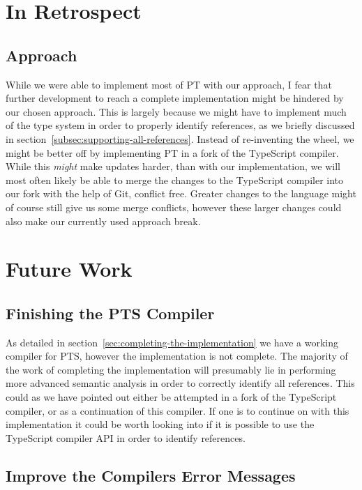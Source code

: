\section{In Retrospect}\label{sec:in-retrospect}

\subsection{Approach}\label{subsec:result-approach}

While we were able to implement most of PT with our approach, I fear that further development to reach a complete implementation might be hindered by our chosen approach.
This is largely because we might have to implement much of the type system in order to properly identify references, as we briefly discussed in section~\vref{subsec:supporting-all-references}.
Instead of re-inventing the wheel, we might be better off by implementing PT in a fork of the TypeScript compiler.
While this \textit{might} make updates harder, than with our implementation, we will most often likely be able to merge the changes to the TypeScript compiler into our fork with the help of Git, conflict free.
Greater changes to the language might of course still give us some merge conflicts, however these larger changes could also make our currently used approach break.

\section{Future Work}\label{sec:future-work}

\subsection{Finishing the PTS Compiler}\label{subsec:finishing-the-pts-compiler}

As detailed in section~\vref{sec:completing-the-implementation} we have a working compiler for PTS, however the implementation is not complete.
The majority of the work of completing the implementation will presumably lie in performing more advanced semantic analysis in order to correctly identify all references.
This could as we have pointed out either be attempted in a fork of the TypeScript compiler, or as a continuation of this compiler.
If one is to continue on with this implementation it could be worth looking into if it is possible to use the TypeScript compiler API in order to identify references.

\subsection{Improve the Compilers Error Messages}\label{subsec:compiler-with-focus-on-error-messages}

